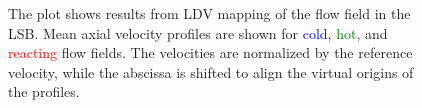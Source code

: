 \begin{figure}

\centering



\caption[Effect of preheat temperature on the LSB flow field - I]{The plot shows results from LDV mapping of the flow field in the LSB. Mean axial velocity profiles are shown for \textcolor{blue}{cold}, \textcolor{green}{hot}, and \textcolor{red}{reacting} flow fields. The velocities are normalized by the reference velocity, while the abscissa is shifted to align the virtual origins of the profiles.}

\label{fig:temperatureLDVResults}

\end{figure}

